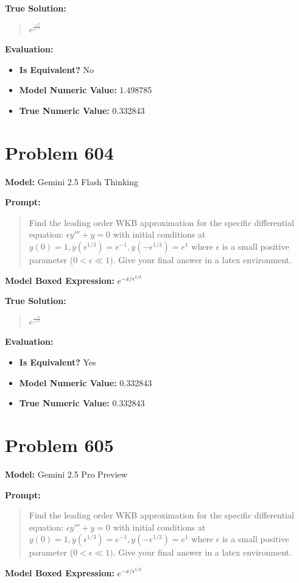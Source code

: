 \documentclass{article}
\begin{document}
\textbf{True Solution:}
\begin{quote}
$e^{\frac{-x}{\epsilon^{1/3}}}$
\end{quote}

\textbf{Evaluation:}
\begin{itemize}
\item \textbf{Is Equivalent?} No
\item \textbf{Model Numeric Value:} 1.498785
\item \textbf{True Numeric Value:} 0.332843
\end{itemize}
\vspace{1cm}
\section*{Problem 604}
\textbf{Model:} Gemini 2.5 Flash Thinking

\textbf{Prompt:}
\begin{quote}
Find the leading order WKB approximation for the specific differential equation: $\epsilon y''' + y = 0$ with initial conditions at $y(0) = 1, y(\epsilon^{1/3}) = e^{-1}, y(-\epsilon^{1/3}) = e^{1} $ where $\epsilon$ is a small positive parameter ($0 < \epsilon \ll 1)$. Give your final answer in a \boxed latex environment.
\end{quote}
\textbf{Model Boxed Expression:} $e^{-x/\epsilon^{1/3}}$

\textbf{True Solution:}
\begin{quote}
$e^{\frac{-x}{\epsilon^{1/3}}}$
\end{quote}

\textbf{Evaluation:}
\begin{itemize}
\item \textbf{Is Equivalent?} Yes
\item \textbf{Model Numeric Value:} 0.332843
\item \textbf{True Numeric Value:} 0.332843
\end{itemize}
\vspace{1cm}
\section*{Problem 605}
\textbf{Model:} Gemini 2.5 Pro Preview

\textbf{Prompt:}
\begin{quote}
Find the leading order WKB approximation for the specific differential equation: $\epsilon y''' + y = 0$ with initial conditions at $y(0) = 1, y(\epsilon^{1/3}) = e^{-1}, y(-\epsilon^{1/3}) = e^{1} $ where $\epsilon$ is a small positive parameter ($0 < \epsilon \ll 1)$. Give your final answer in a \boxed latex environment.
\end{quote}
\textbf{Model Boxed Expression:} $e^{-x/\epsilon^{1/3}}$
\end{document}
